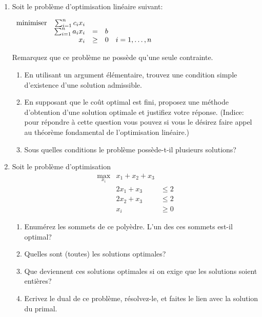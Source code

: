 \begin{enumerate}
  \item Soit le problème d'optimisation linéaire suivant:

    $
    \begin{array}{rrllll}
      \mbox{minimiser} & \sum_{i=1}^n c_i x_i& & \\
      &\sum_{i=1}^n a_i x_i&=&b  \\
      &x_i  & \geq & 0 & i=1, \ldots, n
    \end{array}
    $




    Remarquez que ce problème ne possède qu'une seule contrainte.

    \begin{enumerate}
      \item  En utilisant un argument élémentaire, trouvez une condition simple d'existence d'une solution admissible.


      \item  En  supposant que le coût optimal est fini, proposez une méthode d'obtention d'une solution optimale et justifiez votre réponse. (Indice: pour répondre à cette question vous pouvez si vous le désirez faire appel au théorème fondamental de l'optimisation linéaire.)

      \item Sous quelles conditions le problème possède-t-il plusieurs solutions?

    \end{enumerate}



    \begin{solution}
    \end{solution}

  \item Soit le problème d'optimisation
    \begin{eqnarray*}
      \max_{x_i} & x_1+ x_2+ x_3 &  \\
      &2 x_1 + x_3  &\leq 2 \\
      &2 x_2 + x_3  &\leq 2 \\
      &x_i &\geq 0
    \end{eqnarray*}

  \begin{enumerate} \item Enumérez les sommets de ce polyèdre. L'un des
      ces sommets est-il optimal? \item Quelles sont (toutes) les
      solutions optimales? \item Que deviennent ces solutions optimales si
      on exige que les solutions soient entières? \item Ecrivez le dual de
        ce problème, résolvez-le, et faites le lien avec la solution du
        primal.
    \end{enumerate}



\end{enumerate}
